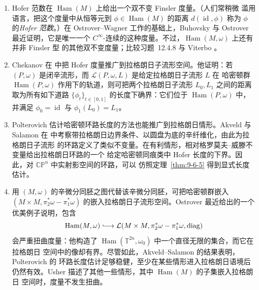 \begin{remark}\label{rem:9-6-6}
\begin{enumerate}[label=\textup{(\roman*)}]
\item {}Hofer 范数在 $\operatorname{Ham}(M)$ 上给出一个双不变 Finsler 度量。（人们常稍微
滥用语言，把这个度量中从恒等元到
$\phi\in\operatorname{Ham}(M)$ 的距离
$d(\operatorname{id},\phi)$ 称为 $\phi$ 的\emph{Hofer 范数}。）在 Ostrover--Wagner
 工作的基础上，Buhovsky 与 Ostrover  最近证明，它是唯一一个
$C^\infty$-连续的这种度量。不过，$\operatorname{Ham}(M,\omega)$ 上还有并非 Finsler 型
的其他双不变度量；比较习题~12.4.8 与 Viterbo 。

\item Chekanov 在  中把 Hofer 度量推广到拉格朗日子流形空间。他证明：若
$(P,\omega)$ 是闭辛流形，而 $\mathcal L(P,\omega,L)$ 是给定拉格朗日子流形 $L$ 在
哈密顿群 $\operatorname{Ham}(P,\omega)$ 作用下的轨道，则可把两个拉格朗日子流形
$L_0,L_1$ 之间的距离取为所有如下道路
$\{\phi_t\}_{t\in[0,1]}$ 的长度下确界：它们位于
$\operatorname{Ham}(P,\omega)$ 中，并满足
$\phi_0=\operatorname{id}$ 与 $\phi_1(L_0)=L_1$。

\item Polterovich 估计哈密顿环路长度的方法也能推广到拉格朗日情形。Akveld 与 Salamon
在  中考察带拉格朗日边界条件、以圆盘为底的辛纤维化，由此为拉格朗日子流形
的环路定义了类似不变量。在有利情形，相对格罗莫夫--威滕不变量给出拉格朗日环路的一个
给定哈密顿同痕类中 Hofer 长度的下界。因此，对 $\mathbb{CP}^n$ 中实射影空间的环路，可以
仿照定理~\ref{thm:9-6-5} 得到显式长度估计。

\item 用 $(M,\omega)$ 的辛微分同胚之图代替该辛微分同胚，可把哈密顿群嵌入
$(M\times M,\pi_2^*\omega-\pi_1^*\omega)$ 的嵌入拉格朗日子流形空间。Ostrover
 最近给出的一个优美例子说明，包含
\[
  \operatorname{Ham}(M,\omega)
  \lhook\joinrel\longrightarrow
  \mathcal L(M\times M,\pi_2^*\omega-\pi_1^*\omega,\operatorname{diag})
\]
会严重扭曲度量：他构造了
$\operatorname{Ham}(\mathbb T^{2n},\omega_0)$ 中一个直径无限的集合，而它在拉格朗日
空间中的像却有界。尽管如此，Akveld--Salamon  的结果表明，Polterovich 的
环路长度估计足够稳健，至少在某些情形进入拉格朗日语境后仍然有效。Usher
 描述了其他一些情形，其中 $\operatorname{Ham}(M)$ 的子集嵌入拉格朗日
空间时，度量不发生扭曲。


\end{enumerate}
\end{remark}
